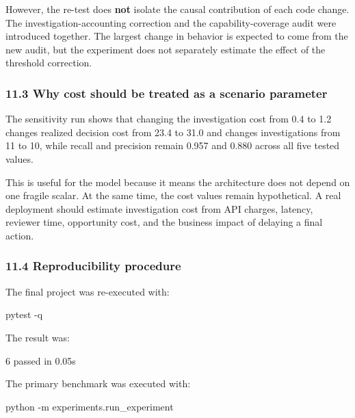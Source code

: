 \documentclass[
]{article}
\newenvironment{Shaded}{}{}
\newcommand{\NormalTok}[1]{#1}
\begin{document}
However, the re-test does \textbf{not} isolate the causal contribution
of each code change. The investigation-accounting correction and the
capability-coverage audit were introduced together. The largest change
in behavior is expected to come from the new audit, but the experiment
does not separately estimate the effect of the threshold correction.

\subsubsection{11.3 Why cost should be treated as a scenario
parameter}\label{why-cost-should-be-treated-as-a-scenario-parameter}

The sensitivity run shows that changing the investigation cost from 0.4
to 1.2 changes realized decision cost from 23.4 to 31.0 and changes
investigations from 11 to 10, while recall and precision remain 0.957
and 0.880 across all five tested values.

This is useful for the model because it means the architecture does not
depend on one fragile scalar. At the same time, the cost values remain
hypothetical. A real deployment should estimate investigation cost from
API charges, latency, reviewer time, opportunity cost, and the business
impact of delaying a final action.

\subsubsection{11.4 Reproducibility
procedure}\label{reproducibility-procedure}

The final project was re-executed with:

\begin{Shaded}
\begin{Highlighting}[]
\NormalTok{pytest {-}q}
\end{Highlighting}
\end{Shaded}

The result was:

\begin{Shaded}
\begin{Highlighting}[]
\NormalTok{6 passed in 0.05s}
\end{Highlighting}
\end{Shaded}

The primary benchmark was executed with:

\begin{Shaded}
\begin{Highlighting}[]
\NormalTok{python {-}m experiments.run\_experiment}
\end{Highlighting}
\end{Shaded}
\end{document}
